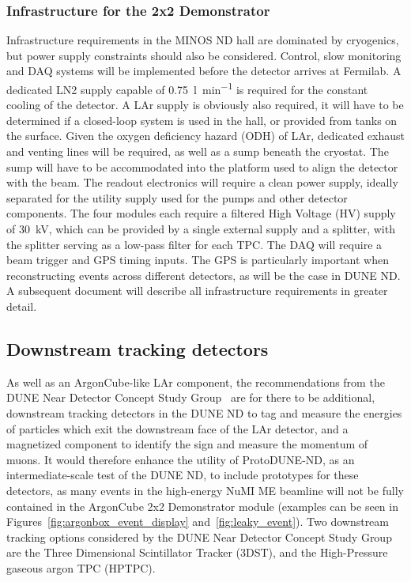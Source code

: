 \subsubsection{Infrastructure for the 2x2 Demonstrator}
Infrastructure requirements in the MINOS ND hall are dominated by cryogenics, but power supply constraints should also be considered.
Control, slow monitoring and DAQ systems will be implemented before the detector arrives at Fermilab.  
A dedicated LN2 supply capable of \SI{0.75}{\litre\per\minute} is required for the constant cooling of the detector. 
A LAr supply is obviously also required, it will have to be determined if a closed-loop system is used in the hall, or provided from tanks on the surface.
Given the oxygen deficiency hazard (ODH) of LAr, dedicated exhaust and venting lines will be required, as well as a sump beneath the cryostat.
The sump will have to be accommodated into the platform used to align the detector with the beam.
The readout electronics will require a clean power supply, ideally separated for the utility supply used for the pumps and other detector components.       
The four modules each require a filtered High Voltage (HV) supply of \SI{30}{\kilo\volt}, which can be provided by a single external supply and a splitter, with the splitter serving as a low-pass filter for each TPC.
The DAQ will require a beam trigger and GPS timing inputs. 
The GPS is particularly important when reconstructing events across different detectors, as will be the case in DUNE ND.
A subsequent document will describe all infrastructure requirements in greater detail.

\subsection{Downstream tracking detectors}
\label{sec:tracking_detectors}
As well as an ArgonCube-like LAr component, the recommendations from the DUNE Near Detector Concept Study Group~\cite{dune_ndcsg} are for there to be additional, downstream tracking detectors in the DUNE ND to tag and measure the energies of particles which exit the downstream face of the LAr detector, and a magnetized component to identify the sign and measure the momentum of muons. It would therefore enhance the utility of ProtoDUNE-ND, as an intermediate-scale test of the DUNE ND, to include prototypes for these detectors, as many events in the high-energy NuMI ME beamline will not be fully contained in the ArgonCube 2x2 Demonstrator module (examples can be seen in Figures~\ref{fig:argonbox_event_display} and~\ref{fig:leaky_event}). 
Two downstream tracking options considered  by the DUNE Near Detector Concept Study Group are the Three Dimensional Scintillator Tracker (3DST), and the High-Pressure gaseous argon TPC (HPTPC).

